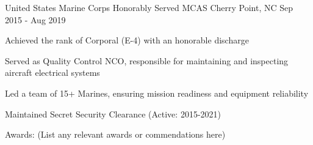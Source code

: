 

\begin{cventries}

  \cventry
    {United States Marine Corps} %
    {Honorably Served} %
    {MCAS Cherry Point, NC} %
    {Sep 2015 - Aug 2019} %
    {
      \begin{cvitems} %
        \item {Achieved the rank of Corporal (E-4) with an honorable discharge}
        \item {Served as Quality Control NCO, responsible for maintaining and inspecting aircraft electrical systems}
        \item {Led a team of 15+ Marines, ensuring mission readiness and equipment reliability}
        \item {Maintained Secret Security Clearance (Active: 2015-2021)}
        \item {Awards: (List any relevant awards or commendations here)}
      \end{cvitems}
    }

\end{cventries}
